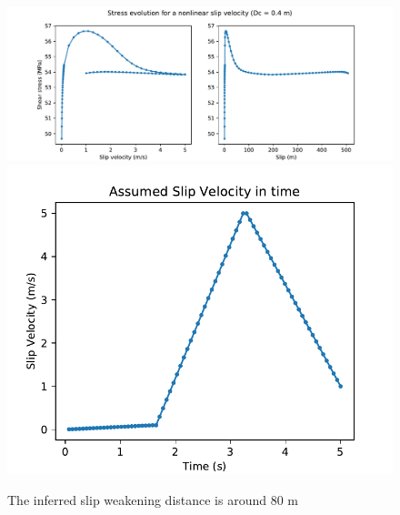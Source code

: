 \documentclass[11pt]{article}
\begin{document}
\begin{figure}[!htb]
    \centering
    \includegraphics[scale=0.6]{fig2.pdf}
    \includegraphics[scale=0.5]{fig2_v.pdf}
    \caption{The inferred slip weakening distance is around 80 m}
\end{figure}
\pagebreak
\end{document}
